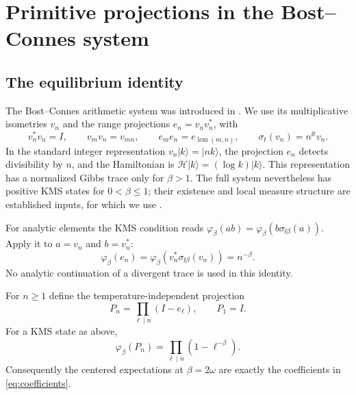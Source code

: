 \section{Primitive projections in the Bost--Connes system}
\label{sec:thermal}

\subsection{The equilibrium identity}

The Bost--Connes arithmetic system was introduced in \cite{BC}.
We use its multiplicative isometries $v_n$ and the range projections
$e_n=v_nv_n^*$, with
\begin{equation}
 v_n^*v_n=I,\qquad v_mv_n=v_{mn},\qquad
 e_me_n=e_{\operatorname{lcm}(m,n)},\qquad
 \sigma_t(v_n)=n^{\ii t}v_n.
 \label{eq:bc_relations}
\end{equation}
In the standard integer representation $v_n|k\rangle=|nk\rangle$,
the projection $e_n$ detects divisibility by $n$, and the Hamiltonian
is $\mathcal H|k\rangle=(\log k)|k\rangle$.
This representation has a normalized Gibbs trace only for $\beta>1$.
The full system nevertheless has positive KMS states for
$0<\beta\le1$; their existence and local measure structure are
established inputs, for which we use \cite[Introduction and Section~2]{Neshveyev}.

For analytic elements the KMS condition reads
$\varphi_\beta(ab)=\varphi_\beta(b\sigma_{\ii\beta}(a))$.
Apply it to $a=v_n$ and $b=v_n^*$:
\begin{equation}
 \varphi_\beta(e_n)
 =\varphi_\beta(v_n^*\sigma_{\ii\beta}(v_n))=n^{-\beta}.
 \label{eq:divisibility_probability}
\end{equation}
No analytic continuation of a divergent trace is used in this identity.

\begin{proposition}
For $n\ge1$ define the temperature-independent projection
\begin{equation}
 P_n=\prod_{\ell\mid n}(I-e_\ell),\qquad P_1=I.
 \label{eq:primitive_projection}
\end{equation}
For a KMS state as above,
\begin{equation}
 \varphi_\beta(P_n)=\prod_{\ell\mid n}(1-\ell^{-\beta}).
 \label{eq:primitive_probability}
\end{equation}
Consequently the centered expectations at $\beta=2\omega$ are exactly
the coefficients in \eqref{eq:coefficients}.
\end{proposition}


